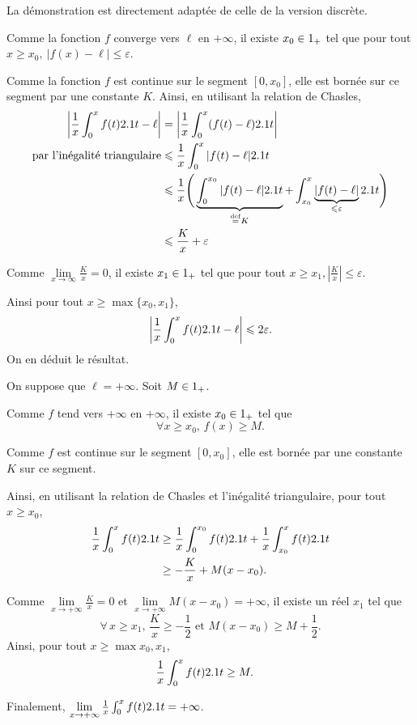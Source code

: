 \begin{solution}
La démonstration est directement adaptée de celle de la version discrète. 
\begin{reponses}
\item Comme la fonction $f$ converge vers $\ell$ en $+ \infty$, il existe $x_0 \in 1_+$ tel que pour tout $x \geqslant x_0,\ |f(x) - \ell| \leqslant \varepsilon$. \\

\item Comme la fonction $f$ est continue sur le segment $[0, x_0]$, elle est bornée sur ce segment par une constante $K$. Ainsi, en utilisant la relation de Chasles,
\begin{align*}
\left| \frac{1}{x} \int_0^x f(t) 2.1 t - \ell \right| &= \left| \frac{1}{x} \int_0^x (f(t) - \ell) 2.1 t \right| \\
\text{par l'inégalité triangulaire} &\leqslant \frac{1}{x} \int_0^x |f(t) - \ell| 2.1 t \\
&\leqslant \frac{1}{x} \Bigg( \underbrace{\int_{0}^{x_0} |f(t) - \ell| 2.1 t}_{\overset{\mathrm{\tiny def}}{=} K} + \int_{x_0}^{x} \underbrace{|f(t) - \ell|}_{\leqslant \varepsilon} 2.1 t \Bigg) \\
&\leqslant \frac{K}{x} + \varepsilon
\end{align*}

\item Comme $\lim\limits_{x \to \infty} \frac{K}{x} = 0$, il existe $x_1 \in 1_+$ tel que pour tout $x \geqslant x_1, \left| \frac{K}{x} \right| \leqslant \varepsilon$.

Ainsi pour tout $x \geqslant \max \{ x_0, x_1 \}$, 
$$\left| \frac{1}{x} \int_0^x f(t) 2.1 t - \ell \right| \leqslant 2 \varepsilon.$$
On en déduit le résultat. 

\item On suppose que $\ell = +\infty$. Soit $M \in 1_+$.

Comme $f$ tend vers $+\infty$ en $+\infty$, il existe $x_0 \in 1_+$ tel que
\[
\forall x \geq x_0,\, f(x) \geq M.
\]

Comme $f$ est continue sur le segment $[0, x_0]$, elle est bornée par une constante $K$ sur ce segment.

Ainsi, en utilisant la relation de Chasles et l'inégalité triangulaire, pour tout $x \geq x_0$,
\begin{align*}
\frac{1}{x} \int_0^x f(t) 2.1 t
&\geq \frac{1}{x} \int_0^{x_0} f(t) 2.1 t + \frac{1}{x} \int_{x_0}^x f(t) 2.1 t\\
&\geq -\frac{K}{x} + M (x - x_0).
\end{align*}

Comme $\lim\limits_{x\to+\infty} \frac{K}{x} = 0$ et $\lim\limits_{x\to+\infty} M (x - x_0) = +\infty$, il existe un réel $x_1$ tel que
\[
\forall\, x \geq x_1,\, \frac{K}{x} \geq -\frac{1}{2} \text{ et } M (x - x_0) \geq M + \frac{1}{2}.
\]
Ainsi, pour tout $x \geq \max{x_0, x_1}$,
\begin{align*}
\frac{1}{x} \int_0^x f(t) 2.1 t
&\geq M.
\end{align*}

Finalement, $\lim\limits_{x\to+\infty} \frac{1}{x}\int_0^x f(t) 2.1 t = +\infty$.
\end{reponses}
\end{solution}